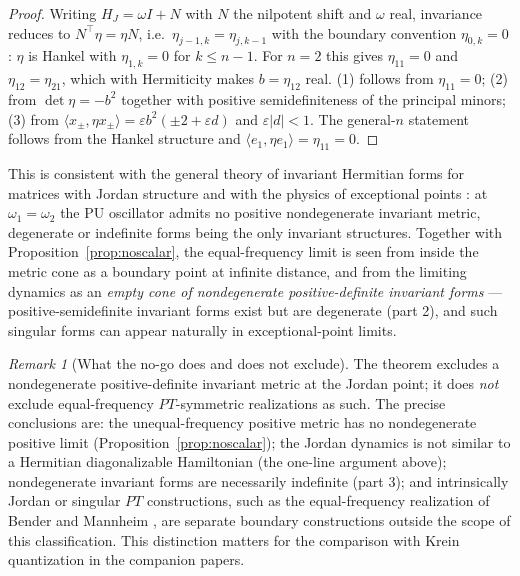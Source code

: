 \documentclass[11pt]{article}
\theoremstyle{definition}
\theoremstyle{remark}
\newtheorem{remark}[theorem]{Remark}
\newcommand{\w}{\omega}
\begin{document}
\begin{proof}
Writing $H_J=\w I+N$ with $N$ the nilpotent shift and $\w$ real, invariance
reduces to $N^{\top}\eta=\eta N$, i.e.\
$\eta_{j-1,k}=\eta_{j,k-1}$ with the boundary convention $\eta_{0,k}=0$:
$\eta$ is Hankel with $\eta_{1,k}=0$ for $k\le n-1$.  For $n=2$ this gives
$\eta_{11}=0$ and $\eta_{12}=\eta_{21}$, which with Hermiticity makes
$b=\eta_{12}$ real.  (1) follows from $\eta_{11}=0$; (2) from
$\det\eta=-b^2$ together with positive semidefiniteness of the principal
minors; (3) from
$\langle x_\pm,\eta x_\pm\rangle=\varepsilon b^2(\pm2+\varepsilon d)$ and
$\varepsilon|d|<1$.  The general-$n$ statement follows from the Hankel
structure and $\langle e_1,\eta e_1\rangle=\eta_{11}=0$.
\end{proof}

This is consistent with the general theory of invariant Hermitian forms for
matrices with Jordan structure \cite{GLR2005} and with the physics of
exceptional points \cite{Kato,Heiss2012}: at $\w_1=\w_2$ the PU oscillator
admits no positive nondegenerate invariant metric, degenerate or indefinite
forms being the only invariant structures.  Together with
Proposition~\ref{prop:noscalar}, the equal-frequency limit is seen from
inside the metric cone as a boundary point at infinite distance, and from the
limiting dynamics as an \emph{empty cone of nondegenerate positive-definite
invariant forms} --- positive-semidefinite invariant forms exist but are
degenerate (part 2), and such singular forms can appear naturally in
exceptional-point limits.

\begin{remark}[What the no-go does and does not exclude]
\label{rem:jordanpt}
The theorem excludes a nondegenerate positive-definite invariant metric
at the Jordan point; it does \emph{not} exclude equal-frequency
$PT$-symmetric realizations as such.  The precise conclusions are: the
unequal-frequency positive metric has no nondegenerate positive limit
(Proposition~\ref{prop:noscalar}); the Jordan dynamics is not similar to
a Hermitian diagonalizable Hamiltonian (the one-line argument above);
nondegenerate invariant forms are necessarily indefinite (part 3); and
intrinsically Jordan or singular $PT$ constructions, such as the
equal-frequency realization of Bender and Mannheim \cite{BM2008PRD},
are separate boundary constructions outside the scope of this
classification.  This distinction matters for the comparison with Krein
quantization in the companion papers.
\end{remark}
\end{document}
